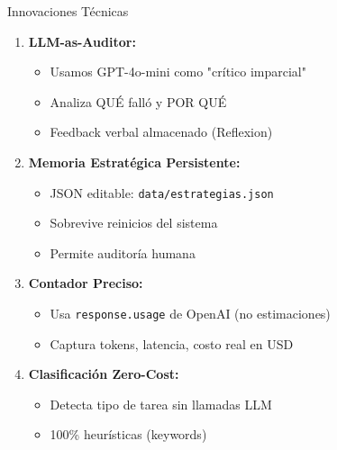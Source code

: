\documentclass[aspectratio=169,11pt]{beamer}
\begin{document}
\begin{frame}{Innovaciones Técnicas}
\begin{enumerate}
    \item \textbf{LLM-as-Auditor:}
    \begin{itemize}
        \item Usamos GPT-4o-mini como "crítico imparcial"
        \item Analiza QUÉ falló y POR QUÉ
        \item Feedback verbal almacenado (Reflexion)
    \end{itemize}
    
    \vspace{0.3cm}
    
    \item \textbf{Memoria Estratégica Persistente:}
    \begin{itemize}
        \item JSON editable: \texttt{data/estrategias.json}
        \item Sobrevive reinicios del sistema
        \item Permite auditoría humana
    \end{itemize}
    
    \vspace{0.3cm}
    
    \item \textbf{Contador Preciso:}
    \begin{itemize}
        \item Usa \texttt{response.usage} de OpenAI (no estimaciones)
        \item Captura tokens, latencia, costo real en USD
    \end{itemize}
    
    \vspace{0.3cm}
    
    \item \textbf{Clasificación Zero-Cost:}
    \begin{itemize}
        \item Detecta tipo de tarea sin llamadas LLM
        \item 100\% heurísticas (keywords)
    \end{itemize}
\end{enumerate}
\end{frame}
\end{document}
